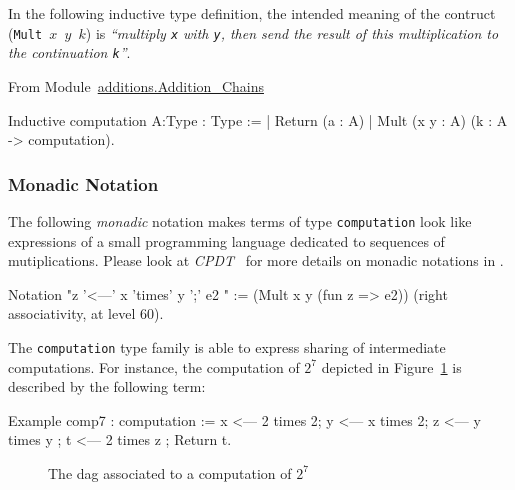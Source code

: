   In the following inductive type definition, the intended meaning 
  of the contruct (\texttt{Mult $x$ $y$ $k$})  is \emph{``multiply \texttt{x} with 
\texttt{y}, then send  the result of this multiplication to 
  the continuation  \texttt{k}''}.



From Module~\href{../theories/html/hydras.additions.Addition_Chains.html}{additions.Addition\_Chains}

\begin{Coqsrc}
Inductive computation {A:Type}  : Type :=
| Return (a : A)
| Mult (x y : A) (k : A -> computation).    
\end{Coqsrc}
\subsubsection{Monadic Notation}


The following \emph{monadic} 
notation makes terms of type \texttt{computation} look like
expressions of a small programming language dedicated to sequences of mutiplications.
Please look at \emph{CPDT}~\cite{chlipalacpdt2011} for more details on monadic notations in \coq.

\begin{Coqsrc}
Notation "z '<---'  x 'times' y ';' e2 " :=
  (Mult x y  (fun z => e2))
    (right associativity, at level 60).
\end{Coqsrc}

The \texttt{computation} type family is able to express sharing of intermediate computations. For instance, the computation of $2^7$ depicted in Figure~\ref{fig:dag7} is described by  the following term:

\begin{Coqsrc}
Example comp7 : computation  :=
  x <--- 2 times 2;
  y <--- x times 2;
  z <--- y times y ;
  t <--- 2 times z ;
  Return t.  
\end{Coqsrc}

\begin{figure}[h]
  \centering
  \caption{The dag associated to a computation of $2^7$}
  \label{fig:dag7}
\end{figure}

